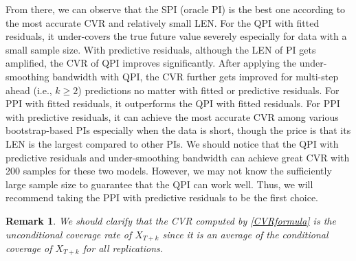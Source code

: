 \documentclass[a4paper]{article}
\newtheorem{Remark}{Remark}[section]
\begin{document}
From there, we can observe that the SPI (oracle PI) is the best one according to the most accurate CVR and relatively small LEN. For the QPI with fitted residuals, it under-covers the true future value severely especially for data with a small sample size. With predictive residuals, although the LEN of PI gets amplified, the CVR of QPI improves significantly. After applying the under-smoothing bandwidth with QPI, the CVR further gets improved for multi-step ahead (i.e., $k\geq 2$) predictions no matter with fitted or predictive residuals. For PPI with fitted residuals, it outperforms the QPI with fitted residuals. For PPI with predictive residuals, it can achieve the most accurate CVR among various bootstrap-based PIs especially when the data is short, though the price is that its LEN is the largest compared to other PIs. We should notice that the QPI with predictive residuals and under-smoothing bandwidth can achieve great CVR with 200 samples for these two models. However, we may not know the sufficiently large sample size to guarantee that the QPI can work well. Thus, we will recommend taking the PPI with predictive residuals to be the first choice. 

\begin{Remark}
    We should clarify that the CVR computed by \cref{CVRformula} is the unconditional coverage rate of $X_{T+k}$ since it is an average of the conditional coverage of $X_{T+k}$ for all replications. 
\end{Remark}
\end{document}
